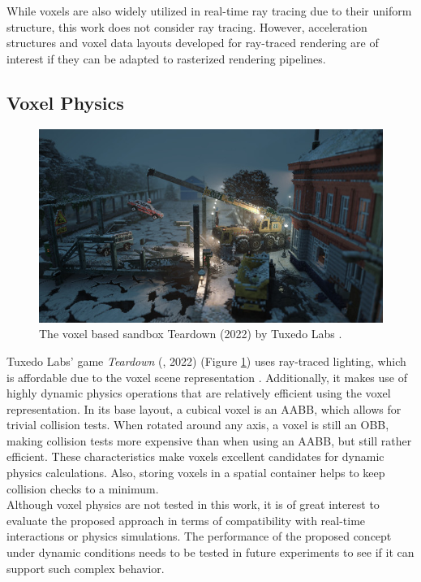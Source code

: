 \noindent
While voxels are also widely utilized in real-time ray tracing due to their uniform structure, this work does 
not consider ray tracing. However, acceleration structures and voxel data layouts developed for ray-traced 
rendering are of interest if they can be adapted to rasterized rendering pipelines.


\subsection*{Voxel Physics} \label{subsec-voxel-physics}

\begin{figure}[h]
    \centering
    \includegraphics[width=\linewidth]{images/graphics/teardown.jpg}
    \caption{The voxel based sandbox Teardown (2022) by Tuxedo Labs \cite{TuxedoLabs2022}.}
    \label{fig:teardown}
\end{figure}

\noindent
Tuxedo Labs' game \emph{Teardown} (\cite{TeardownSteam2022}, 2022) (Figure \ref{fig:teardown}) uses ray-traced 
lighting, which is affordable due to the voxel scene representation \cite{TuxedoLabs2022}. Additionally, 
it makes use of highly dynamic physics operations that are relatively efficient using the voxel representation. 
In its base layout, a cubical voxel is an \ac{AABB}, which allows for trivial collision tests. When rotated 
around any axis, a voxel is still an \ac{OBB}, making collision tests more expensive than when using an \ac{AABB}, 
but still rather efficient. These characteristics make voxels excellent candidates for dynamic physics 
calculations. Also, storing voxels in a spatial container helps to keep collision checks to a minimum. \\

\noindent
Although voxel physics are not tested in this work, it is of great interest to evaluate the proposed approach 
in terms of compatibility with real-time interactions or physics simulations. The performance of the proposed 
concept under dynamic conditions needs to be tested in future experiments to see if it can support such complex 
behavior.
\enlargethispage{\baselineskip}
\enlargethispage{\baselineskip}

